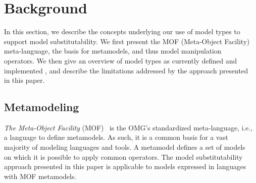 %
%	

\section{Background}\label{background}

In this section, we describe the concepts underlying our use of model types to support model substitutability.
We first present the MOF (Meta-Object Facility) meta-language, the basis for metamodels, and thus model manipulation operators. We then give an overview of model types as currently defined and implemented \cite{Steel07,ecmfa12}, and describe the limitations addressed by the approach presented in this paper. 

\subsection{Metamodeling}

{\em The Meta-Object Facility} (MOF)~\cite{MOF} is the OMG's standardized meta-language, i.e., a language to define metamodels. As such, it is a common basis for a vast majority of modeling languages and tools. A metamodel defines a set of models on which it is possible to apply common operators. The model substitutability approach presented in this paper is applicable to models expressed in languages with MOF metamodels. 


